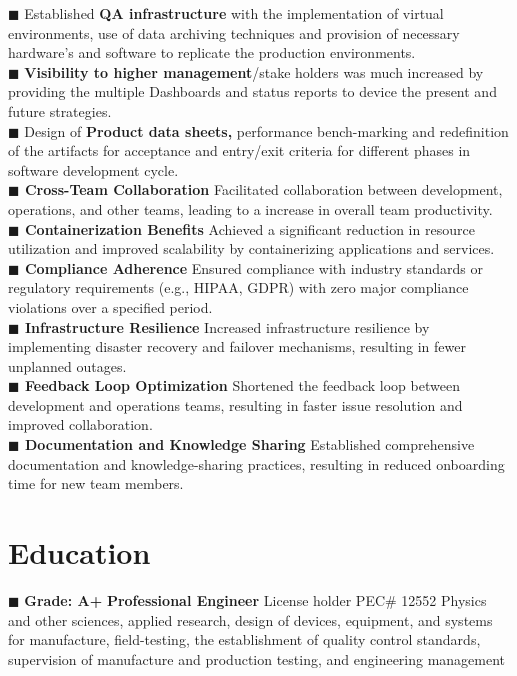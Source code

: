 \documentclass[]{cv-class}
\begin{document}
    	$\blacksquare$ Established\textbf{ QA infrastructure} with the implementation of virtual environments, use of data archiving techniques and provision of necessary hardware’s and software to replicate the production environments.\\
    	$\blacksquare$ \textbf{Visibility to higher management}/stake holders was much increased by providing the multiple Dashboards and status reports to device the present and future strategies.\\
    	$\blacksquare$ Design of \textbf{Product data sheets, }performance bench-marking and redefinition of the artifacts for acceptance and entry/exit criteria for different phases in software development cycle.\\
      \textbf{$\blacksquare$ Cross-Team Collaboration} Facilitated collaboration between development, operations, and other teams, leading to a increase in overall team productivity.\\
         \textbf{$\blacksquare$ Containerization Benefits} Achieved a significant reduction in resource utilization and improved scalability by containerizing applications and services.\\
         \textbf{$\blacksquare$ Compliance Adherence} Ensured compliance with industry standards or regulatory requirements (e.g., HIPAA, GDPR) with zero major compliance violations over a specified period.\\
    \textbf{$\blacksquare$ Infrastructure Resilience} Increased infrastructure resilience by implementing disaster recovery and failover mechanisms, resulting in fewer unplanned outages.\\
         \textbf{$\blacksquare$ Feedback Loop Optimization} Shortened the feedback loop between development and operations teams, resulting in faster issue resolution and improved collaboration.\\
         \textbf{$\blacksquare$ Documentation and Knowledge Sharing} Established comprehensive documentation and knowledge-sharing practices, resulting in reduced onboarding time for new team members.
\section{Education}
    {   {\vspace{2mm} $\blacksquare$ }  }{ \textbf{Grade: A+}\newline {\vspace{2mm} $\blacksquare$ } \textbf{Professional Engineer} License holder PEC# 12552 \newline Physics and other sciences, applied research, design of devices, equipment, and systems for manufacture, field-testing, the establishment of quality control standards, supervision of manufacture and production testing, and engineering management
}
\end{document}
